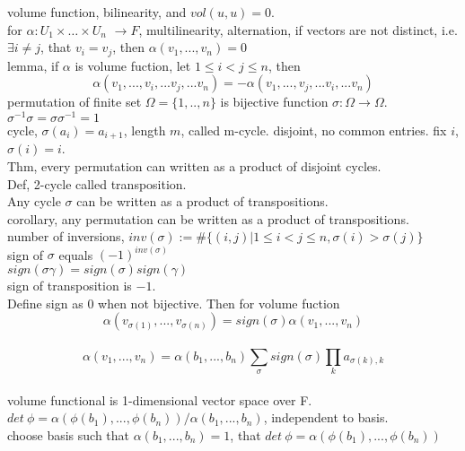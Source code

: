 \documentclass[paper=a4, fontsize=11pt]{scrartcl} %
\numberwithin{equation}{section} %
\numberwithin{figure}{section} %
\numberwithin{table}{section} %
\begin{document}
volume function, bilinearity, and $vol(u,u) = 0$.\\
for $\alpha : U_1\times\dots\times U_n$ $\rightarrow F$, multilinearity, alternation, if vectors are not distinct, i.e. $\exists i\neq j$, that $v_i=v_j$, then $\alpha(v_1,...,v_n)=0$\\
lemma, if $\alpha$ is volume fuction, let $1\leq i<j\leq n$, then
\begin{equation}
\alpha(v_1,...,v_i,...v_j,...v_n) = - \alpha(v_1,...,v_j,...v_i,...v_n)
\end{equation}
permutation of finite set $\Omega=\{1,..,n\}$ is bijective function $\sigma:\Omega\rightarrow\Omega$. $\sigma^{-1}\sigma = \sigma\sigma^{-1} = 1$\\
cycle, $\sigma (a_i)= a_{i+1}$, length $m$, called m-cycle. disjoint, no common entries. fix $i$, $\sigma(i) = i$.\\
Thm, every permutation can written as a product of disjoint cycles.\\
Def, 2-cycle called transposition.\\
Any cycle $\sigma$ can be written as a product of transpositions.\\
corollary, any permutation can be written as a product of transpositions.\\
number of inversions, $inv(\sigma):= \#\{(i,j)|1\leq i<j\leq n, \sigma(i)>\sigma(j)\}$\\
sign of $\sigma$ equals $(-1)^{inv(\sigma)}$\\
$sign(\sigma\gamma)= sign(\sigma)sign(\gamma)$\\
sign of transposition is $-1$.\\
Define sign as 0 when not bijective. Then for volume fuction
\begin{equation}
\alpha (v_{\sigma(1)},...,v_{\sigma(n)})= sign(\sigma)\alpha(v_1,...,v_n)
\end{equation}\\
\begin{equation}
\alpha(v_1,...,v_n) = \alpha(b_1,...,b_n)\sum_\sigma sign(\sigma)\prod_k a_{\sigma(k),k}
\end{equation}\\
volume functional is 1-dimensional vector space over F.\\
$det\ \phi = \alpha(\phi(b_1),...,\phi(b_n))/\alpha(b_1,...,b_n)$, independent to basis.\\
choose basis such that $\alpha(b_1,...,b_n)=1$, that $det\ \phi = \alpha(\phi(b_1),...,\phi(b_n))$
\end{document}
